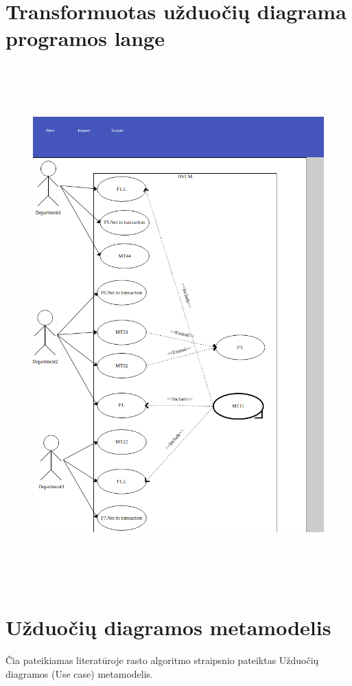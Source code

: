 \documentclass{VUMIFInfBakalaurinis}
\begin{document}
\section{Transformuotas užduočių diagrama programos lange} \label{appendix:use_cases_window}
\begin{figure}[H]
    \centering
    \includegraphics[height=20cm]{img/use_cases_window}
\end{figure}

\section{Užduočių diagramos metamodelis} \label{appendix:lit_alg_metamodels_uc}

Čia pateikiamas literatūroje rasto algoritmo straipsnio \cite{algUseCasesFromBpmn} pateiktas Užduočių diagramos (Use case) metamodelis.
\end{document}
